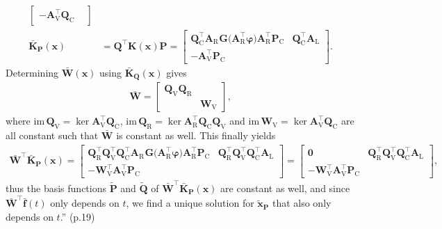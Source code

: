 \documentclass[a4paper, 10pt,
    ]{article}
\newcommand{\mb}[1]{\mathbf{#1}}
\newcommand{\mbt}[1]{\tilde{\mathbf{#1}}}
\newcommand{\mbb}[1]{\bar{\mathbf{#1}}}
\newcommand{\mr}[1]{\mathrm{#1}}
\newcommand{\T}{{\!\top}}
\newcommand{\A}[1]{\mb{A}_\mr{#1}}
\newcommand{\AT}[1]{\mb{A}_\mr{#1}^{\T}}
\newcommand{\vphi}{\boldsymbol{\varphi}}
\begin{document}
\begin{itemize}
\begin{itemize}
{\begin{align*}
\begin{bmatrix}
                    -\AT{V} \mb{Q}_\mr{C} &
                \end{bmatrix}\\
                \mbb{K}_\mb{P}(\mb{x}) &= \mb{Q}^\T \mb{K}(\mb{x}) \mb{P} = \begin{bmatrix}
                    \mb{Q}_\mr{C}^\T \A{R}^{\phantom{\T}} \mb{G} \big( \AT{R} \vphi \big) \AT{R} \mb{P}_\mr{C} & \mb{Q}_\mr{C}^\T \A{L}\\
                    -\AT{V} \mb{P}_\mr{C} &
                \end{bmatrix}.
            \end{align*}
            Determining $\mbb{W}(\mb{x})$ using $\mbb{K}_\mb{Q}(\mb{x})$ gives
            \begin{align*}
                \mbb{W} = \begin{bmatrix}
                    \mb{Q}_\mr{V} \mb{Q}_\mr{R} &\\
                    & \mb{W}_\mr{V}
                \end{bmatrix},
            \end{align*}
            where $\mr{im\, } \mb{Q}_\mr{V} = \ker \AT{V} \mb{Q}_\mr{C}$, $\mr{im\, } \mb{Q}_\mr{R} = \ker \AT{R} \mb{Q}_\mr{C} \mb{Q}_\mr{V}$ and $\mr{im\, } \mb{W}_\mr{V} = \ker \AT{V} \mb{Q}_\mr{C}$ are all constant such that $\mbb{W}$ is constant as well. This finally yields
            \begin{align*}
                \mbb{W}^\T \mbb{K}_\mb{P}(\mb{x}) = \begin{bmatrix}
                    \mb{Q}_\mr{R}^\T \mb{Q}_\mr{V}^\T \mb{Q}_\mr{C}^\T \A{R}^{\phantom{\T}} \mb{G} \big( \AT{R} \vphi \big) \AT{R} \mb{P}_\mr{C} & \mb{Q}_\mr{R}^\T \mb{Q}_\mr{V}^\T \mb{Q}_\mr{C}^\T \A{L}\\
                    -\mb{W}_\mr{V}^\T \AT{V} \mb{P}_\mr{C} &
                \end{bmatrix} = \begin{bmatrix}
                    \mb{0} & \mb{Q}_\mr{R}^\T \mb{Q}_\mr{V}^\T \mb{Q}_\mr{C}^\T \A{L}\\
                    -\mb{W}_\mr{V}^\T \AT{V} \mb{P}_\mr{C} &
                \end{bmatrix},
            \end{align*}
            thus the basis functions $\mbt{P}$ and $\mbt{Q}$ of $\mbb{W}^\T \mbb{K}_\mb{P}(\mb{x})$ are constant as well, and since $\mbb{W}^\T \mbb{f}(t)$ only depends on $t$, we find a unique solution for $\mbt{x}_\mb{P}$ that also only depends on $t$.}'' (p.19)

\end{itemize}
\end{itemize}
\end{document}
